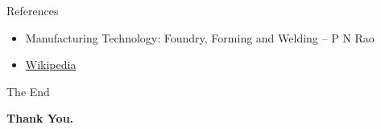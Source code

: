 \documentclass[11pt,t]{beamer}
\begin{document}
    \begin{frame}{References}
        \begin{itemize}
            \item Manufacturing Technology: Foundry, Forming and Welding -- P N Rao
            \item \href{https://wikipeida.com}{\color{blue}Wikipedia}
        \end{itemize}
    \end{frame}

    \begin{frame}{The End}
        \begin{center}
            \vfill
            \textbf{\Huge Thank You.}
            \vfill
        \end{center}
    \end{frame}
\end{document}
